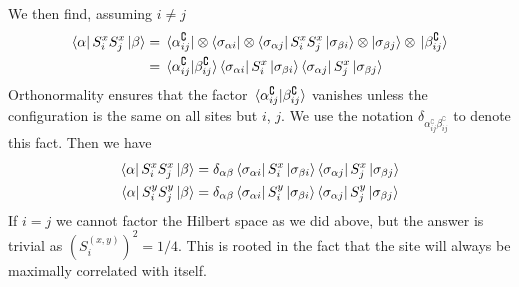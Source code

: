 \documentclass{report}
\begin{document}
 We then find, assuming $ i\neq j $
\begin{align*}
	\bra{\alpha} S_i^x S_j^x \ket{\beta}
	&= \bra*{\alpha_{ij}^\complement} \otimes \bra{\sigma_{\alpha i}}
	\otimes \bra{\sigma_{\alpha j}}
	S_i^x S_j^x \ket{\sigma_{\beta i}} \otimes \ket{\sigma_{\beta j}}
	\otimes \ket*{\beta_{ij}^\complement}\\
	&= \braket*{\alpha_{ij}^\complement}{\beta_{ij}^\complement}
	\bra{\sigma_{\alpha i}}S_i^x \ket{\sigma_{\beta i}}
	\bra{\sigma_{\alpha j}}S_j^x \ket{\sigma_{\beta j}}
\end{align*}
Orthonormality ensures that the factor $ \braket*{\alpha_{ij}^\complement}{\beta_{ij}^\complement} $
vanishes unless the configuration is the same on all sites but $ i$, $ j $. 
We use the notation $ \delta_{\alpha^\complement_{ij} \beta^\complement_{ij}} $ to denote this fact. 
Then we have
\begin{gather*}
	\bra{\alpha} S_i^x S_j^x \ket{\beta}
		= \delta_{\alpha\beta}
			\bra{\sigma_{\alpha i}}S_i^x \ket{\sigma_{\beta i}}
			\bra{\sigma_{\alpha j}}S_j^x \ket{\sigma_{\beta j}}\\
	\bra{\alpha} S_i^y S_j^y \ket{\beta}
		= \delta_{\alpha\beta}
			\bra{\sigma_{\alpha i}}S_i^y \ket{\sigma_{\beta i}}
			\bra{\sigma_{\alpha j}}S_j^y \ket{\sigma_{\beta j}}
\end{gather*}
If $ i = j $ we cannot factor the Hilbert space as we did above, but the 
answer is trivial as $ (S_i^{(x,y)})^2 = 1/4 $. This is rooted in the fact
that the site will always be maximally correlated with itself.

\end{document}
